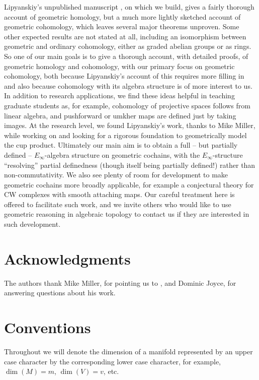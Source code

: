 Lipyanskiy's unpublished manuscript \cite{Lipy14}, on which we build, gives a fairly thorough account of geometric homology, but a much more lightly sketched account of geometric cohomology, which leaves several major theorems  unproven.
Some other expected results are not stated at all, including an isomorphism between geometric and ordinary cohomology, either as graded abelian groups or as rings.
So one of our main goals is to give a thorough account, with detailed proofs, of geometric homology and cohomology, with our primary focus on geometric cohomology, both because Lipyanskiy's account of this requires more filling in and also because cohomology with its algebra structure is of more interest to us.
In addition to research applications, we find these ideas helpful in teaching graduate students as, for example, cohomology of projective spaces follows from linear algebra, and pushforward or umkher maps are defined just by taking images.
At the research level, we found Lipyanskiy's work, thanks to Mike Miller, while working on \cite{FMS-flows} and looking for a rigorous foundation to geometrically model the cup product.
Ultimately our main aim is to obtain a full -- but partially defined -- $E_\infty$-algebra structure on geometric cochains, with the $E_\infty$-structure ``resolving'' partial definedness (though itself being partially defined!) rather than non-commutativity.
We also see plenty of room for development to make geometric cochains more broadly applicable, for example a conjectural theory for CW complexes with smooth attaching maps.
Our careful treatment here is offered to facilitate such work, and we invite others who would like to use geometric reasoning in algebraic topology to contact us if they are interested in such development.

\section*{Acknowledgments}

The authors thank Mike Miller, for pointing us to \cite{Lipy14}, and Dominic Joyce, for answering questions about his work.

\section*{Conventions}

Throughout we will denote the dimension of a manifold represented by an upper case character by the corresponding lower case character, for example, $\dim(M)=m$, $\dim(V)=v$, etc.